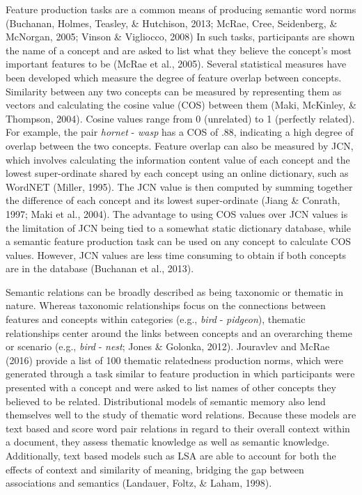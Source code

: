 \documentclass[english,man]{apa6}
\theoremstyle{definition}
\theoremstyle{definition}
\theoremstyle{definition}
\theoremstyle{remark}
\begin{document}
Feature production tasks are a common means of producing semantic word
norms (Buchanan, Holmes, Teasley, \& Hutchison, 2013; McRae, Cree,
Seidenberg, \& McNorgan, 2005; Vinson \& Vigliocco, 2008) In such tasks,
participants are shown the name of a concept and are asked to list what
they believe the concept's most important features to be (McRae et al.,
2005). Several statistical measures have been developed which measure
the degree of feature overlap between concepts. Similarity between any
two concepts can be measured by representing them as vectors and
calculating the cosine value (COS) between them (Maki, McKinley, \&
Thompson, 2004). Cosine values range from 0 (unrelated) to 1 (perfectly
related). For example, the pair \emph{hornet} - \emph{wasp} has a COS of
.88, indicating a high degree of overlap between the two concepts.
Feature overlap can also be measured by JCN, which involves calculating
the information content value of each concept and the lowest
super-ordinate shared by each concept using an online dictionary, such
as WordNET (Miller, 1995). The JCN value is then computed by summing
together the difference of each concept and its lowest super-ordinate
(Jiang \& Conrath, 1997; Maki et al., 2004). The advantage to using COS
values over JCN values is the limitation of JCN being tied to a somewhat
static dictionary database, while a semantic feature production task can
be used on any concept to calculate COS values. However, JCN values are
less time consuming to obtain if both concepts are in the database
(Buchanan et al., 2013).

Semantic relations can be broadly described as being taxonomic or
thematic in nature. Whereas taxonomic relationships focus on the
connections between features and concepts within categories (e.g.,
\emph{bird} - \emph{pidgeon}), thematic relationships center around the
links between concepts and an overarching theme or scenario (e.g.,
\emph{bird} - \emph{nest}; Jones \& Golonka, 2012). Jouravlev and McRae
(2016) provide a list of 100 thematic relatedness production norms,
which were generated through a task similar to feature production in
which participants were presented with a concept and were asked to list
names of other concepts they believed to be related. Distributional
models of semantic memory also lend themselves well to the study of
thematic word relations. Because these models are text based and score
word pair relations in regard to their overall context within a
document, they assess thematic knowledge as well as semantic knowledge.
Additionally, text based models such as LSA are able to account for both
the effects of context and similarity of meaning, bridging the gap
between associations and semantics (Landauer, Foltz, \& Laham, 1998).
\end{document}
